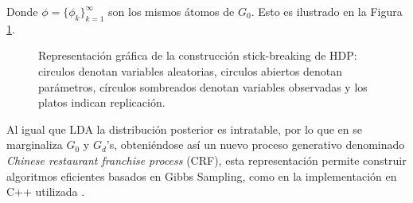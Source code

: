 \documentclass[letterpaper,12pt,oneside]{book} %
\begin{document}
Donde $\phi = \{\phi_{k}\}_{k=1}^{\infty}$ son los mismos átomos de $G_{0}$. Esto es ilustrado en la Figura \ref{img:hdp_sbc}.

\begin{figure}
  \centering
\caption{Representación gráfica de la construcción stick-breaking de HDP: circulos denotan variables aleatorias, circulos abiertos denotan parámetros, círculos sombreados denotan variables observadas y los platos indican replicación.}
\label{img:hdp_sbc}
\end{figure}

Al igual que LDA la distribución posterior es intratable, por lo que en \citep{teh2005sharing} se marginaliza $G_{0}$ y $G_{d}$'s, obteniéndose así un nuevo proceso generativo denominado \textit{Chinese restaurant franchise process} (CRF), esta representación permite construir algoritmos eficientes basados en Gibbs Sampling, como en la implementación en C++ utilizada \citep{HDP}.

\end{document}
